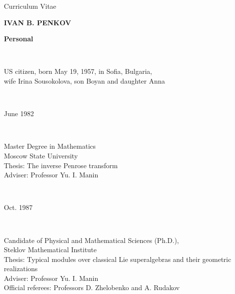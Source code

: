 
\textwidth=145mm
\newcommand{\thc}[2]{\noindent\parbox[t]{40mm}{#1}\
\parbox[t]{105mm}{#2}\\
}
\def\ls{\vskip.25in}
\def\ss{\vskip.10in}




\begin{center}
Curriculum Vitae

\medskip

{\large{\bf IVAN B. PENKOV}}
\end{center}

\bigskip

\thc{\bf Personal}{US citizen, born May 19, 1957, in Sofia,
Bulgaria,\\ wife Irina Sousokolova, son Boyan and daughter Anna}

\medskip


\medskip

\thc{June 1982}{Master Degree in Mathematics\\
Moscow State University \\ Thesis:  The inverse Penrose
transform\\
Adviser:  Professor Yu. I. Manin\\}
\thc{Oct. 1987}{Candidate of Physical and Mathematical Sciences (Ph.D.),\\
Steklov Mathematical Institute\\
Thesis:  Typical modules over classical Lie superalgebras and their
geometric realizations\\
Adviser:  Professor Yu. I. Manin\\
Official referees:  Professors D. Zhelobenko and A. Rudakov}

\bigskip


\medskip

